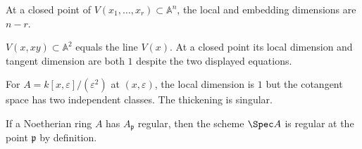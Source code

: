 \begin{example}\label{ex:vi32-17}
At a closed point of $V(x_1,\ldots,x_r)\subset\mathbb A^n$, the local and embedding dimensions are $n-r$.
\end{example}

\begin{example}\label{ex:vi32-18}
$V(x,xy)\subset\mathbb A^2$ equals the line $V(x)$. At a closed point its local dimension and tangent dimension are both $1$ despite the two displayed equations.
\end{example}

\begin{example}\label{ex:vi32-19}
For $A=k[x,\varepsilon]/(\varepsilon^2)$ at $(x,\varepsilon)$, the local dimension is $1$ but the cotangent space has two independent classes. The thickening is singular.
\end{example}

\begin{example}\label{ex:vi32-20}
If a Noetherian ring $A$ has $A_{\mathfrak p}$ regular, then the scheme $\Spec A$ is regular at the point $\mathfrak p$ by definition.
\end{example}
